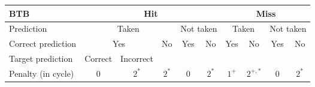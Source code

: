 \begin{tabular}{|l|c|c|c|c|c|c|c|c|c|}
    \hline
    
    BTB 
    & \multicolumn{5}{|c|}{Hit} 
    & \multicolumn{4}{|c|}{Miss} 
    \tabularnewline\hline

    Prediction 
    & \multicolumn{3}{|c|}{Taken} 
    & \multicolumn{2}{|c|}{Not taken} 
    & \multicolumn{2}{|c|}{Taken} 
    & \multicolumn{2}{|c|}{Not taken}
    \tabularnewline\hline

    Correct prediction
    & \multicolumn{2}{|c|}{Yes}
    & \multirow{2}{*}{No}
    & \multirow{2}{*}{Yes}
    & \multirow{2}{*}{No}
    & \multirow{2}{*}{Yes}
    & \multirow{2}{*}{No}
    & \multirow{2}{*}{Yes}
    & \multirow{2}{*}{No}
    \tabularnewline\cline{1-3}

    Target prediction
    & Correct
    & Incorrect
    &
    &
    &
    &
    &
    &
    &
    \tabularnewline\hline

    Penalty (in cycle)
    & $0$
    & $2^*$
    & $2^*$
    & $0$
    & $2^*$
    & $1^+$
    & $2^{+,*}$
    & $0$
    & $2^*$
    \tabularnewline\hline
    
\end{tabular}
